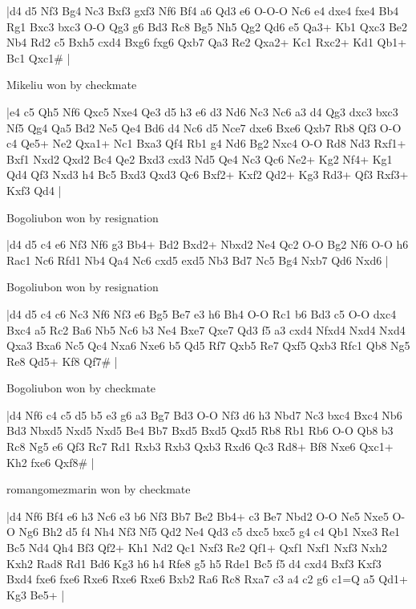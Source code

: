 \makegametitle
|d4 d5 Nf3 Bg4 Nc3 Bxf3 gxf3 Nf6 Bf4 a6 Qd3 e6 O-O-O Nc6 e4 dxe4 fxe4 Bb4 Rg1 Bxc3 bxc3 O-O Qg3 g6 Bd3 Rc8 Bg5 Nh5 Qg2 Qd6 e5 Qa3+ Kb1 Qxc3 Be2 Nb4 Rd2 c5 Bxh5 cxd4 Bxg6 fxg6 Qxb7 Qa3 Re2 Qxa2+ Kc1 Rxc2+ Kd1 Qb1+ Bc1 Qxc1\#  |

\showboard

Mikeliu won by checkmate

\makegametitle
|e4 c5 Qh5 Nf6 Qxc5 Nxe4 Qe3 d5 h3 e6 d3 Nd6 Nc3 Nc6 a3 d4 Qg3 dxc3 bxc3 Nf5 Qg4 Qa5 Bd2 Ne5 Qe4 Bd6 d4 Nc6 d5 Nce7 dxe6 Bxe6 Qxb7 Rb8 Qf3 O-O c4 Qe5+ Ne2 Qxa1+ Nc1 Bxa3 Qf4 Rb1 g4 Nd6 Bg2 Nxc4 O-O Rd8 Nd3 Rxf1+ Bxf1 Nxd2 Qxd2 Bc4 Qe2 Bxd3 cxd3 Nd5 Qe4 Nc3 Qc6 Ne2+ Kg2 Nf4+ Kg1 Qd4 Qf3 Nxd3 h4 Bc5 Bxd3 Qxd3 Qc6 Bxf2+ Kxf2 Qd2+ Kg3 Rd3+ Qf3 Rxf3+ Kxf3 Qd4  |

\showboard

Bogoliubon won by resignation

\makegametitle
|d4 d5 c4 e6 Nf3 Nf6 g3 Bb4+ Bd2 Bxd2+ Nbxd2 Ne4 Qc2 O-O Bg2 Nf6 O-O h6 Rac1 Nc6 Rfd1 Nb4 Qa4 Nc6 cxd5 exd5 Nb3 Bd7 Nc5 Bg4 Nxb7 Qd6 Nxd6  |

\showboard

Bogoliubon won by resignation

\makegametitle
|d4 d5 c4 c6 Nc3 Nf6 Nf3 e6 Bg5 Be7 e3 h6 Bh4 O-O Rc1 b6 Bd3 c5 O-O dxc4 Bxc4 a5 Rc2 Ba6 Nb5 Nc6 b3 Ne4 Bxe7 Qxe7 Qd3 f5 a3 cxd4 Nfxd4 Nxd4 Nxd4 Qxa3 Bxa6 Nc5 Qc4 Nxa6 Nxe6 b5 Qd5 Rf7 Qxb5 Re7 Qxf5 Qxb3 Rfc1 Qb8 Ng5 Re8 Qd5+ Kf8 Qf7\#  |

\showboard

Bogoliubon won by checkmate

\makegametitle
|d4 Nf6 c4 c5 d5 b5 e3 g6 a3 Bg7 Bd3 O-O Nf3 d6 h3 Nbd7 Nc3 bxc4 Bxc4 Nb6 Bd3 Nbxd5 Nxd5 Nxd5 Be4 Bb7 Bxd5 Bxd5 Qxd5 Rb8 Rb1 Rb6 O-O Qb8 b3 Rc8 Ng5 e6 Qf3 Rc7 Rd1 Rxb3 Rxb3 Qxb3 Rxd6 Qc3 Rd8+ Bf8 Nxe6 Qxc1+ Kh2 fxe6 Qxf8\#  |

\showboard

romangomezmarin won by checkmate

\makegametitle
|d4 Nf6 Bf4 e6 h3 Nc6 e3 b6 Nf3 Bb7 Be2 Bb4+ c3 Be7 Nbd2 O-O Ne5 Nxe5 O-O Ng6 Bh2 d5 f4 Nh4 Nf3 Nf5 Qd2 Ne4 Qd3 c5 dxc5 bxc5 g4 c4 Qb1 Nxe3 Re1 Bc5 Nd4 Qh4 Bf3 Qf2+ Kh1 Nd2 Qc1 Nxf3 Re2 Qf1+ Qxf1 Nxf1 Nxf3 Nxh2 Kxh2 Rad8 Rd1 Bd6 Kg3 h6 h4 Rfe8 g5 h5 Rde1 Bc5 f5 d4 cxd4 Bxf3 Kxf3 Bxd4 fxe6 fxe6 Rxe6 Rxe6 Rxe6 Bxb2 Ra6 Rc8 Rxa7 c3 a4 c2 g6 c1=Q a5 Qd1+ Kg3 Be5+  |


